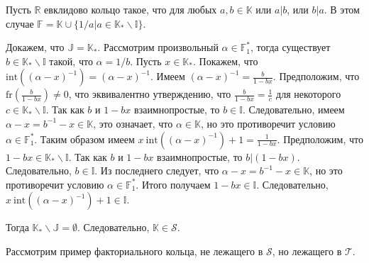 \documentclass[_00_dissertation.tex]{subfiles}
\begin{document}
\begin{example}\label{example:a|b or b|a}
    Пусть $\mathbb{R}$ евклидово кольцо такое, что для любых $a,b\in\mathbb{K}$ или $a|b$, или $b|a$.
    В этом случае $\mathbb{F}=\mathbb{K}\cup\{1/a|a\in\mathbb{K}_{*}\backslash\mathbb{I}\}$.

    Докажем, что $\mathbb{J}=\mathbb{K}_{*}$.
    Рассмотрим произвольный $\alpha\in\mathbb{F}_{1}^{*}$, тогда существует $b\in\mathbb{K}_{*}\backslash\mathbb{I}$ такой, что $\alpha=1/b$.
    Пусть $x\in\mathbb{K}_{*}$.
    Покажем, что $\textrm{int}((\alpha-x)^{-1})=(\alpha-x)^{-1}$.
    Имеем $(\alpha-x)^{-1}=\frac{b}{1-bx}$.
    Предположим, что $\textrm{fr}(\frac{b}{1-bx})\neq0$, что эквивалентно утверждению, что $\frac{b}{1-bx}=\frac{1}{c}$ для некоторого $c\in\mathbb{K}_{*}\backslash\mathbb{I}$.
    Так как $b$ и $1-bx$ взаимнопростые, то $b\in\mathbb{I}$.
    Следовательно, имеем $\alpha-x=b^{-1}-x\in\mathbb{K}$, это означает, что $\alpha\in\mathbb{K}$, но это противоречит условию $\alpha\in\mathbb{F}_{1}^{*}$.
    Таким образом имеем $x\ \textrm{int}((\alpha-x)^{-1})+1=\frac{1}{1-bx}$.
    Предположим, что $1-bx\in\mathbb{K}_{*}\backslash\mathbb{I}$.
    Так как $b$ и $1-bx$ взаимнопростые, то $b|(1-bx)$.
    Следовательно, $b\in\mathbb{I}$.
    Из последнего следует, что $\alpha-x=b^{-1}-x\in\mathbb{K}$, но это противоречит условию $\alpha\in\mathbb{F}_{1}^{*}$.
    Итого получаем $1-bx\in\mathbb{I}$.
    Следовательно, $x\ \textrm{int}((\alpha-x)^{-1})+1\in\mathbb{I}$.

	Тогда $\mathbb{K}_{*}\backslash\mathbb{J} = \emptyset$.
    Следовательно, $\mathbb{K}\in \mathcal{S}$.
\end{example}

Рассмотрим пример факториального кольца, не лежащего в $\mathcal{S}$, но лежащего в $\mathcal{T}$.
\end{document}
